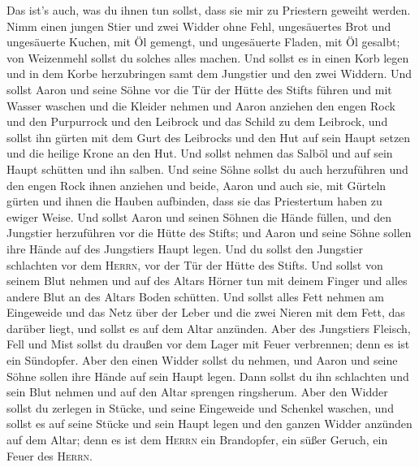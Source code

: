  Das ist's auch, was du ihnen tun sollst, dass sie mir zu
Priestern geweiht werden. Nimm einen jungen Stier und zwei Widder ohne
Fehl,  ungesäuertes Brot und ungesäuerte Kuchen, mit Öl
gemengt, und ungesäuerte Fladen, mit Öl gesalbt; von Weizenmehl sollst
du solches alles machen.  Und sollst es in einen Korb
legen und in dem Korbe herzubringen samt dem Jungstier und den zwei
Widdern.  Und sollst Aaron und seine Söhne vor die Tür der
Hütte des Stifts führen und mit Wasser waschen  und die
Kleider nehmen und Aaron anziehen den engen Rock und den Purpurrock und
den Leibrock und das Schild zu dem Leibrock, und sollst ihn gürten mit
dem Gurt des Leibrocks  und den Hut auf sein Haupt setzen
und die heilige Krone an den Hut.  Und sollst nehmen das
Salböl und auf sein Haupt schütten und ihn salben.  Und
seine Söhne sollst du auch herzuführen und den engen Rock ihnen anziehen
 und beide, Aaron und auch sie, mit Gürteln gürten und
ihnen die Hauben aufbinden, dass sie das Priestertum haben zu ewiger
Weise. Und sollst Aaron und seinen Söhnen die Hände füllen,
 und den Jungstier herzuführen vor die Hütte des Stifts;
und Aaron und seine Söhne sollen ihre Hände auf des Jungstiers Haupt
legen.  Und du sollst den Jungstier schlachten vor dem
\textsc{Herrn}, vor der Tür der Hütte des Stifts.  Und
sollst von seinem Blut nehmen und auf des Altars Hörner tun mit deinem
Finger und alles andere Blut an des Altars Boden schütten.
 Und sollst alles Fett nehmen am Eingeweide und das Netz
über der Leber und die zwei Nieren mit dem Fett, das darüber liegt, und
sollst es auf dem Altar anzünden.  Aber des Jungstiers
Fleisch, Fell und Mist sollst du draußen vor dem Lager mit Feuer
verbrennen; denn es ist ein Sündopfer.  Aber den einen
Widder sollst du nehmen, und Aaron und seine Söhne sollen ihre Hände auf
sein Haupt legen.  Dann sollst du ihn schlachten und sein
Blut nehmen und auf den Altar sprengen ringsherum.  Aber
den Widder sollst du zerlegen in Stücke, und seine Eingeweide und
Schenkel waschen, und sollst es auf seine Stücke und sein Haupt legen
 und den ganzen Widder anzünden auf dem Altar; denn es
ist dem \textsc{Herrn} ein Brandopfer, ein süßer Geruch, ein Feuer des
\textsc{Herrn}.

